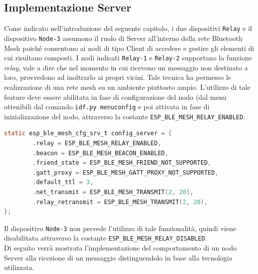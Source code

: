\subsection{Implementazione Server}
\label{sub:implementazione server}
Come indicato nell'introduzione del seguente capitolo, i due dispositivi \texttt{Relay} e il dispositivo \texttt{Node-3} assumono il ruolo di Server all'interno della rete Bluetooth Mesh poiché consentono ai nodi di tipo Client  di accedere e gestire gli elementi di cui risultano composti. 
I nodi indicati \texttt{Relay-1} e \texttt{Relay-2} supportano la funzione \textit{relay}, vale a dire che nel momento in cui ricevono un messaggio non destinato a loro, provvedono ad inoltrarlo ai propri vicini. Tale tecnica ha permesso le realizzazione di una rete mesh su un ambiente piuttosto ampio. L'utilizzo di tale feature deve essere abilitata in fase di configurazione del nodo (dal menu ottenibili dal comando \texttt{idf.py menuconfig} e poi attivata in fase di inizializzazione del nodo, attraverso la costante \texttt{ESP\_BLE\_MESH\_RELAY\_ENABLED}.\\ 

\begin{lstlisting}[language=C, caption= attivazione feature \textit{relay}]
static esp_ble_mesh_cfg_srv_t config_server = {
        .relay = ESP_BLE_MESH_RELAY_ENABLED,
        .beacon = ESP_BLE_MESH_BEACON_ENABLED,
        .friend_state = ESP_BLE_MESH_FRIEND_NOT_SUPPORTED,
        .gatt_proxy = ESP_BLE_MESH_GATT_PROXY_NOT_SUPPORTED,
        .default_ttl = 3,
        .net_transmit = ESP_BLE_MESH_TRANSMIT(2, 20),
        .relay_retransmit = ESP_BLE_MESH_TRANSMIT(2, 20),
};
\end{lstlisting}

\noindent Il dispositivo \texttt{Node-3} non prevede l'utilizzo di tale funzionalità, quindi viene disabilitata attraverso la costante \texttt{ESP\_BLE\_MESH\_RELAY\_DISABLED}.\\
Di seguito verrà mostrata l'implementazione del comportamento di un nodo Server alla ricezione di un messaggio distinguendolo in base alla tecnologia utilizzata.\\


